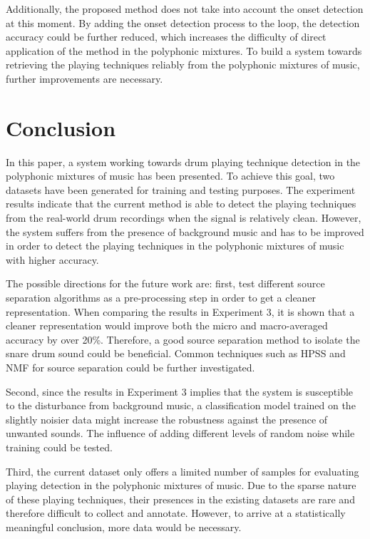 \documentclass{article}
\begin{document}
Additionally, the proposed method does not take into account the onset detection at this moment. By adding the onset detection process to the loop, the detection accuracy could be further reduced, which increases the difficulty of direct application of the method in the polyphonic mixtures. To build a system towards retrieving the playing techniques reliably from the polyphonic mixtures of music, further improvements are necessary.  

\section{Conclusion}
\label{sec:conclusion}
In this paper, a system working towards drum playing technique detection in the polyphonic mixtures of music has been presented. To achieve this goal, two datasets have been generated for training and testing purposes. The experiment results indicate that the current method is able to detect the playing techniques from the real-world drum recordings when the signal is relatively clean. However, the system suffers from the presence of background music and has to be improved in order to detect the playing techniques in the polyphonic mixtures of music with higher accuracy. 

The possible directions for the future work are: first, test different source separation algorithms as a pre-processing step in order to get a cleaner representation. When comparing the results in Experiment 3, it is shown that a cleaner representation would improve both the micro and macro-averaged accuracy by over 20\%. Therefore, a good source separation method to isolate the snare drum sound could be beneficial. Common techniques such as HPSS and NMF for source separation could be further investigated.

Second, since the results in Experiment 3 implies that the system is susceptible to the disturbance from background music, a classification model trained on the slightly noisier data might increase the robustness against the presence of unwanted sounds. The influence of adding different levels of random noise while training could be tested.

Third, the current dataset only offers a limited number of samples for evaluating playing detection in the polyphonic mixtures of music. Due to the sparse nature of these playing techniques, their presences in the existing datasets  are rare and therefore difficult to collect and annotate. However, to arrive at a statistically meaningful conclusion, more data would be necessary.
\end{document}

